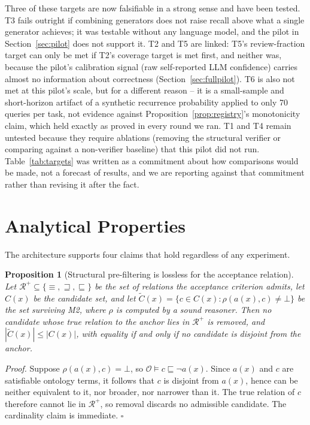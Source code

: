 \documentclass[conference]{IEEEtran}
\newcommand{\onto}{\mathcal{O}}
\newcommand{\rel}{\rho}
\newtheorem{proposition}{Proposition}
\begin{document}
Three of these targets are now falsifiable in a strong sense and have been tested. T3 fails outright if combining generators does not raise recall above what a single generator achieves; it was testable without any language model, and the pilot in Section~\ref{sec:pilot} does not support it. T2 and T5 are linked: T5's review-fraction target can only be met if T2's coverage target is met first, and neither was, because the pilot's calibration signal (raw self-reported LLM confidence) carries almost no information about correctness (Section~\ref{sec:fullpilot}). T6 is also not met at this pilot's scale, but for a different reason -- it is a small-sample and short-horizon artifact of a synthetic recurrence probability applied to only 70 queries per task, not evidence against Proposition~\ref{prop:registry}'s monotonicity claim, which held exactly as proved in every round we ran. T1 and T4 remain untested because they require ablations (removing the structural verifier or comparing against a non-verifier baseline) that this pilot did not run. Table~\ref{tab:targets} was written as a commitment about how comparisons would be made, not a forecast of results, and we are reporting against that commitment rather than revising it after the fact.

\section{Analytical Properties}
\label{sec:analysis}

The architecture supports four claims that hold regardless of any experiment.

\begin{proposition}[Structural pre-filtering is lossless for the acceptance relation]
\label{prop:prefilter}
Let $\mathcal{R}^{+} \subseteq \{\equiv, \sqsupseteq, \sqsubseteq\}$ be the set of relations the acceptance criterion admits, let $C(x)$ be the candidate set, and let $\tilde{C}(x) = \{c \in C(x) : \rel(a(x),c) \neq \bot\}$ be the set surviving M2, where $\rel$ is computed by a sound reasoner. Then no candidate whose true relation to the anchor lies in $\mathcal{R}^{+}$ is removed, and $|\tilde{C}(x)| \le |C(x)|$, with equality if and only if no candidate is disjoint from the anchor.
\end{proposition}

\noindent\textit{Proof.} Suppose $\rel(a(x),c) = \bot$, so $\onto \models c \sqsubseteq \neg a(x)$. Since $a(x)$ and $c$ are satisfiable ontology terms, it follows that $c$ is disjoint from $a(x)$, hence can be neither equivalent to it, nor broader, nor narrower than it. The true relation of $c$ therefore cannot lie in $\mathcal{R}^{+}$, so removal discards no admissible candidate. The cardinality claim is immediate. \hfill$\square$
\end{document}
